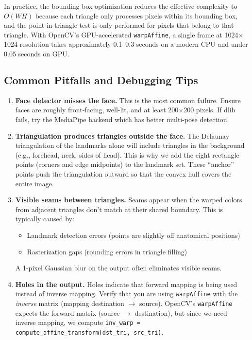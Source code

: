 In practice, the bounding box optimization reduces the effective complexity to $O(WH)$ because each triangle only processes pixels within its bounding box, and the point-in-triangle test is only performed for pixels that belong to that triangle. With OpenCV's GPU-accelerated \texttt{warpAffine}, a single frame at 1024$\times$1024 resolution takes approximately 0.1--0.3 seconds on a modern CPU and under 0.05 seconds on GPU.

\subsection{Common Pitfalls and Debugging Tips}

\begin{enumerate}
    \item \textbf{Face detector misses the face.} This is the most common failure. Ensure faces are roughly front-facing, well-lit, and at least 200$\times$200 pixels. If dlib fails, try the MediaPipe backend which has better multi-pose detection.

    \item \textbf{Triangulation produces triangles outside the face.} The Delaunay triangulation of the landmarks alone will include triangles in the background (e.g., forehead, neck, sides of head). This is why we add the eight rectangle points (corners and edge midpoints) to the landmark set. These ``anchor'' points push the triangulation outward so that the convex hull covers the entire image.

    \item \textbf{Visible seams between triangles.} Seams appear when the warped colors from adjacent triangles don't match at their shared boundary. This is typically caused by:
    \begin{itemize}
        \item Landmark detection errors (points are slightly off anatomical positions)
        \item Rasterization gaps (rounding errors in triangle filling)
    \end{itemize}
    A 1-pixel Gaussian blur on the output often eliminates visible seams.

    \item \textbf{Holes in the output.} Holes indicate that forward mapping is being used instead of inverse mapping. Verify that you are using \texttt{warpAffine} with the \emph{inverse} matrix (mapping destination $\to$ source). OpenCV's \texttt{warpAffine} expects the forward matrix (source $\to$ destination), but since we need inverse mapping, we compute \texttt{inv\_warp = compute\_affine\_transform(dst\_tri, src\_tri)}.


\end{enumerate}
